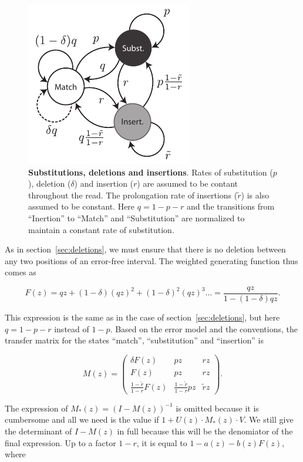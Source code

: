 \documentclass{article}
\begin{document}
\begin{figure}[h]
\centering
\includegraphics[scale=0.9]{insertions.pdf}
\caption{\textbf{Substitutions, deletions and insertions}. Rates of
substitution ($p$), deletion ($\delta$) and insertion ($r$) are assumed to
be contant throughout the read. The prolongation rate of insertions
($\tilde{r}$) is also assumed to be constant. Here $q = 1-p-r$ and the
transitions from ``Inertion'' to ``Match'' and ``Substitution'' are
normalized to maintain a constant rate of substitution.}
\label{fig:insertions}
\end{figure}

As in section~\ref{sec:deletions}, we must ensure that there is no deletion
between any two positions of an error-free interval. The weighted
generating function thus comes as

\begin{equation*}
F(z) = qz + (1-\delta)(qz)^2 + (1-\delta)^2(qz)^3 \ldots =
\frac{qz}{1-(1-\delta)qz}.
\end{equation*}

This expression is the same as in the case of section~\ref{sec:deletions},
but here $q = 1-p-r$ instead of $1-p$. Based on the error model and the
conventions, the transfer matrix for the states ``match'',
``substitution'' and ``insertion'' is

\begin{equation*}
M(z) = \left(
\begin{matrix}
\delta F(z) & pz      & rz  \\
F(z)        & pz      & rz  \\
\frac{1-\tilde{r}}{1-r}F(z)   & \frac{1-\tilde{r}}{1-r}pz & \tilde{r}z
\end{matrix}
\right).
\end{equation*}

The expression of $M_*(z) = (I-M(z))^{-1}$ is omitted because it is
cumbersome and all we need is the value if $1+U(z)\cdot M_*(z)\cdot V$.
We still give the determinant of $I-M(z)$ in full because this will be the
denomiator of the final expression. Up to a factor $1-r$, it is equal to
$1-a(z)-b(z)F(z)$, where
\end{document}
